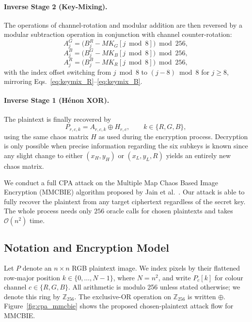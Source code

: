 \paragraph{Inverse Stage 2 (Key-Mixing).}
The operations of channel-rotation and modular addition are then reversed by a
modular subtraction operation in conjunction with channel counter-rotation:
\begin{equation}
    A_{j}^{G} = \bigl(B_{j}^{R} - MK_G[j \bmod 8]\bigr) \bmod 256,
    \label{eq:keymix_dec_G}
\end{equation}
\begin{equation}
    A_{j}^{B} = \bigl(B_{j}^{G} - MK_B[j \bmod 8]\bigr) \bmod 256,
    \label{eq:keymix_dec_B}
\end{equation}
\begin{equation}
    A_{j}^{R} = \bigl(B_{j}^{B} - MK_R[j \bmod 8]\bigr) \bmod 256,
    \label{eq:keymix_dec_R}
\end{equation}
with the index offset switching from $j \bmod 8$ to
$(j-8) \bmod 8$ for $j \geq 8$, mirroring Eqs.~\eqref{eq:keymix_R}--\eqref{eq:keymix_B}.

\paragraph{Inverse Stage 1 (H\'enon XOR).}
The plaintext is finally recovered by
\begin{equation}
    P_{r,c,k} = A_{r,c,k} \oplus H_{r,c},
    \qquad k \in \{R,G,B\},
    \label{eq:henon_dec}
\end{equation}
using the same chaos matrix $H$ as used during the encryption process.
Decryption is only possible when precise information regarding the six subkeys is known since any slight change to either $(x_H, y_H)$ or $(x_L, y_L, R)$ yields an entirely new chaos matrix.


We conduct a full CPA attack on the Multiple Map Chaos Based Image Encryption
(MMCBIE) algorithm proposed by Jain et al.~\cite{jain2024mmcbie}. Our attack is able to
fully recover the plaintext from any target ciphertext regardless of the secret key.
The whole process needs only $256$ oracle calls for chosen plaintexts and takes
$\mathcal{O}(n^2)$ time.

\subsection{Notation and Encryption Model}
\label{subsec:notation}

Let $P$ denote an $n \times n$ RGB plaintext image. We index pixels by their
flattened row-major position $k \in \{0, \ldots, N-1\}$, where $N = n^2$, and
write $P_c[k]$ for colour channel $c \in \{R, G, B\}$. All arithmetic is
modulo 256 unless stated otherwise; we denote this ring by $\mathbb{Z}_{256}$.
The exclusive-OR operation on $\mathbb{Z}_{256}$ is written $\oplus$.
Figure~\ref{fig:cpa_mmcbie} shows the proposed chosen-plaintext attack flow for MMCBIE.

